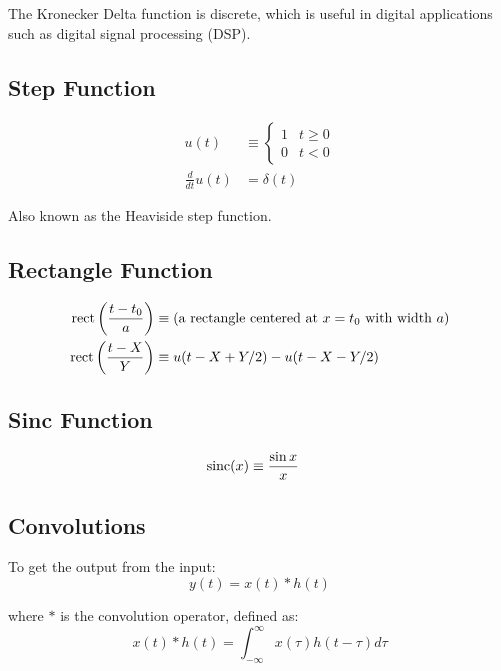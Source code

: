 The Kronecker Delta function is discrete, which is useful in digital applications such as digital signal processing (DSP).

\subsection{Step Function}

\begin{align*}
    u(t)              & \equiv \begin{cases} 1 & t \ge 0 \\ 0 & t < 0 \end{cases} \\
    \frac{d}{dt} u(t) & = \delta(t)
\end{align*}

Also known as the Heaviside step function.

\subsection{Rectangle Function}

\begin{align*}
    \text{rect}\left(\frac{t - t_0}{a}\right) & \equiv (\text{a rectangle centered at $x=t_0$ with width $a$}) \\
    \text{rect}\left(\frac{t - X}{Y}\right)   & \equiv u(t - X + Y/2) - u(t - X - Y/2)
\end{align*}

\subsection{Sinc Function}

\begin{align*}
    \text{sinc}(x) & \equiv \frac{\sin x}{x}
\end{align*}

\subsection{Convolutions}

To get the output from the input:
\begin{equation*}
    y(t) = x(t) \ast h(t)
\end{equation*}

where $\ast$ is the convolution operator, defined as:
\begin{equation*}
    x(t) \ast h(t) = \int_{-\infty}^{\infty} x(\tau) h(t - \tau) d\tau
\end{equation*}

